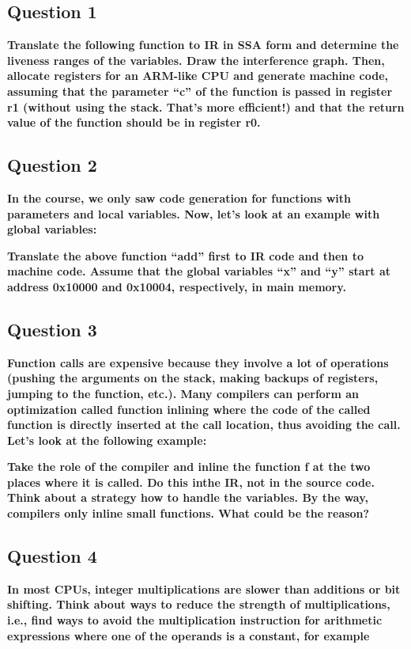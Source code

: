 \subsection{Question 1}
    \textbf{Translate the following function to IR in SSA form and determine the liveness ranges of the variables. Draw the interference graph. Then, allocate registers for an ARM-like CPU and generate machine
code, assuming that the parameter “c” of the function is passed in register r1 (without using the stack. That’s more efficient!) and that the return value of the function should be in register r0.}

    

    

\subsection{Question 2}
    \textbf{In the course, we only saw code generation for functions with parameters and local variables. Now,
let’s look at an example with global variables:}

    

    \textbf{Translate the above function “add” first to IR code and then to machine code. Assume that the global
variables “x” and “y” start at address 0x10000 and 0x10004, respectively, in main memory.}
    

\subsection{Question 3}
    \textbf{Function calls are expensive because they involve a lot of operations (pushing the arguments on the stack, making backups of registers, jumping to the function, etc.). Many compilers can perform an optimization called function inlining where the code of the called function is directly inserted at the call location, thus avoiding the call. Let’s look at the following example:}

    

    \textbf{Take the role of the compiler and inline the function f at the two places where it is called. Do this inthe IR, not in the source code. Think about a strategy how to handle the variables. By the way, compilers only inline small functions. What could be the reason?}

    

\subsection{Question 4}
    \textbf{In most CPUs, integer multiplications are slower than additions or bit shifting. Think about ways to reduce the strength of multiplications, i.e., find ways to avoid the multiplication instruction for arithmetic expressions where one of the operands is a constant, for example }

    

    